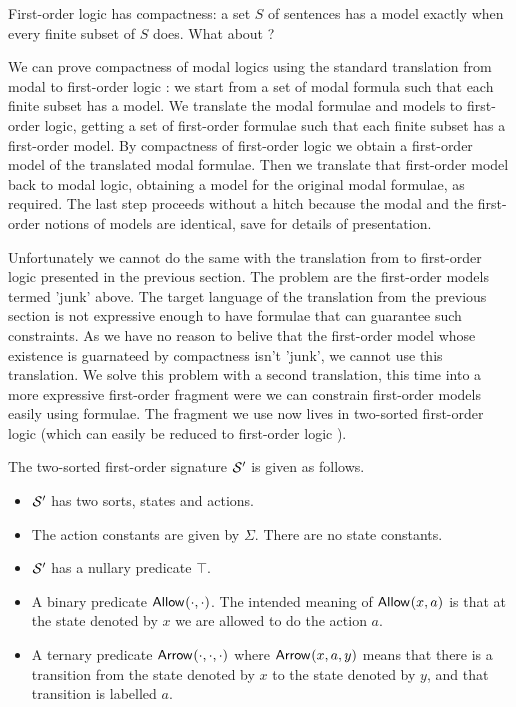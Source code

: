 \NI First-order logic has compactness: a set $S$ of sentences has a
model exactly when every finite subset of $S$ does. What about
\cathoristic{}?

We can prove compactness of modal logics using the standard
translation from modal to first-order logic \cite{BlackburnP:modlog}:
we start from a set of modal formula such that each finite subset has
a model. We translate the modal formulae and models to first-order
logic, getting a set of first-order formulae such that each finite
subset has a first-order model. By compactness of first-order logic we
obtain a first-order model of the translated modal formulae. Then we
translate that first-order model back to modal logic, obtaining a
model for the original modal formulae, as required. The last step
proceeds without a hitch because the modal and the first-order notions
of models are identical, save for details of presentation.

Unfortunately we cannot do the same with the translation from
\cathoristic{} to first-order logic presented in the previous
section. The problem are the first-order models termed 'junk' above.
The target language of the translation from the previous section is
not expressive enough to have formulae that can guarantee such
constraints.  As we have no reason to belive that the first-order
model whose existence is guarnateed by compactness isn't 'junk', we
cannot use this translation.  We solve this problem with a second
translation, this time into a more expressive first-order fragment
were we can constrain first-order models easily using formulae. The
fragment we use now lives in two-sorted first-order logic (which can
easily be reduced to first-order logic \cite{EndertonHB:matinttl}).

\begin{definition}
The two-sorted first-order signature $\mathcal{S}'$ is given as follows.
\begin{itemize}

\item $\mathcal{S}'$ has two sorts, states and actions. 

\item The action constants are given by $\Sigma$. There
are no state constants. 

\item $\mathcal{S}'$ has a nullary predicate $\top$.

\item A binary predicate $\mathsf{Allow}^{}(\cdot, \cdot)$. The intended
  meaning of $\mathsf{Allow}^{}(x, a)$ is that at the state denoted by $x$ we
  are allowed to do the action $a$.

\item A ternary predicate $\mathsf{Arrow}^{}(\cdot, \cdot, \cdot)$ where
  $\mathsf{Arrow}^{}(x, a, y)$ means that there is a transition from the
  state denoted by $x$ to the state denoted by $y$, and that
  transition is labelled $a$.

\end{itemize}
\end{definition}

